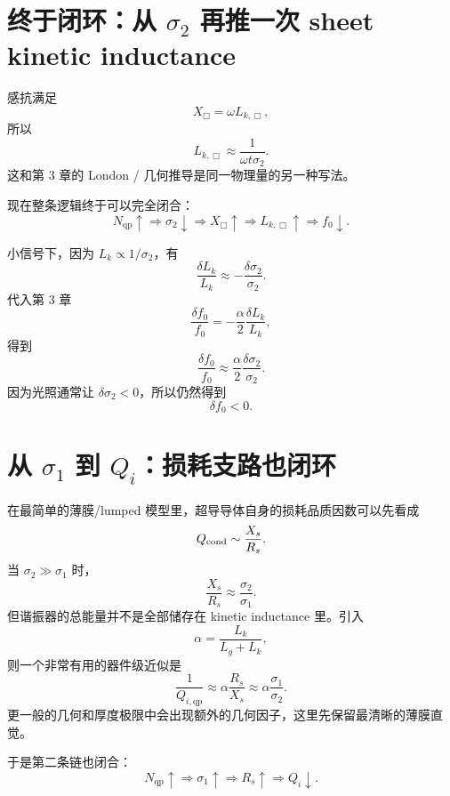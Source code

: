 \documentclass[11pt,a4paper,openany]{ctexrep}
\newcommand{\qp}{\mathrm{qp}}
\begin{document}
\section{终于闭环：从 $\sigma_2$ 再推一次 sheet kinetic inductance}

感抗满足
\[
X_{\Box}=\omega L_{k,\Box},
\]
所以
\[
\boxed{
L_{k,\Box}
\approx
\frac{1}{\omega t\sigma_2}.
}
\]
这和第 3 章的 London / 几何推导是同一物理量的另一种写法。

现在整条逻辑终于可以完全闭合：
\[
N_{\qp}\uparrow
\Rightarrow
\sigma_2\downarrow
\Rightarrow
X_{\Box}\uparrow
\Rightarrow
L_{k,\Box}\uparrow
\Rightarrow
f_0\downarrow.
\]

小信号下，因为 $L_k\propto1/\sigma_2$，有
\[
\frac{\delta L_k}{L_k}
\approx
-\frac{\delta\sigma_2}{\sigma_2}.
\]
代入第 3 章
\[
\frac{\delta f_0}{f_0}
=-\frac{\alpha}{2}\frac{\delta L_k}{L_k},
\]
得到
\[
\boxed{
\frac{\delta f_0}{f_0}
\approx
\frac{\alpha}{2}
\frac{\delta\sigma_2}{\sigma_2}.
}
\]
因为光照通常让 $\delta\sigma_2<0$，所以仍然得到
\[
\boxed{\delta f_0<0.}
\]

\section{从 $\sigma_1$ 到 $Q_i$：损耗支路也闭环}

在最简单的薄膜/lumped 模型里，超导导体自身的损耗品质因数可以先看成
\[
Q_{\rm cond}
\sim
\frac{X_s}{R_s}.
\]
当 $\sigma_2\gg\sigma_1$ 时，
\[
\frac{X_s}{R_s}
\approx
\frac{\sigma_2}{\sigma_1}.
\]
但谐振器的总能量并不是全部储存在 kinetic inductance 里。引入
\[
\alpha=\frac{L_k}{L_g+L_k},
\]
则一个非常有用的器件级近似是
\[
\boxed{
\frac{1}{Q_{i,\qp}}
\approx
\alpha\frac{R_s}{X_s}
\approx
\alpha\frac{\sigma_1}{\sigma_2}.
}
\]
更一般的几何和厚度极限中会出现额外的几何因子，这里先保留最清晰的薄膜直觉。

于是第二条链也闭合：
\[
N_{\qp}\uparrow
\Rightarrow
\sigma_1\uparrow
\Rightarrow
R_s\uparrow
\Rightarrow
Q_i\downarrow.
\]

\begin{center}
\end{center}
\end{document}
